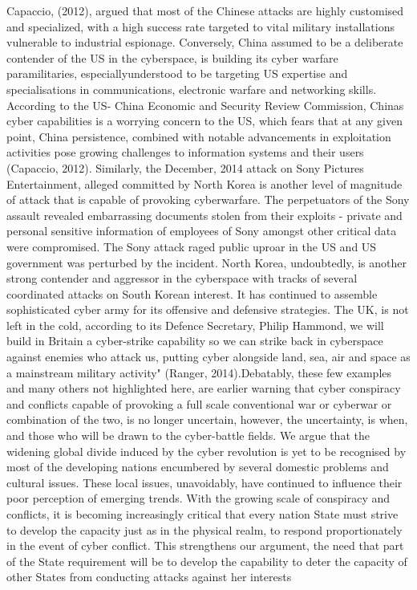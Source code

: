 \documentclass[11pt,a4paper]{article}
\begin{document}
Capaccio, (2012), argued that most of the Chinese attacks are highly customised and specialized, with a high success rate targeted to vital military installations vulnerable to industrial espionage. Conversely, China assumed 
to be a deliberate contender of the US in the cyberspace, is building its cyber warfare paramilitaries, especiallyunderstood to be targeting US expertise and specialisations in communications, electronic warfare and 
networking skills. According to the US- China Economic and Security Review Commission, Chinas cyber capabilities is a worrying concern to the US, which fears that at any given point, China persistence, combined 
with notable advancements in exploitation activities pose growing challenges to information systems and their users (Capaccio, 2012). 
Similarly, the December, 2014 attack on Sony Pictures Entertainment, alleged committed by North Korea is another level of magnitude of attack that is capable of provoking cyberwarfare. The perpetuators of the 
Sony assault revealed embarrassing documents stolen from their exploits - private and personal sensitive information of employees of Sony amongst other critical data were compromised. The Sony attack raged public 
uproar in the US and US government was perturbed by the incident. North Korea, undoubtedly, is another strong contender and aggressor in the cyberspace with tracks of several coordinated attacks on South Korean interest. It 
has continued to assemble sophisticated cyber army for its offensive and defensive strategies. The UK, is not left in the cold, according to its Defence Secretary, Philip Hammond, we will build in Britain a cyber-strike 
capability so we can strike back in cyberspace against enemies who attack us, putting cyber alongside land, sea, air and space as a mainstream military activity" (Ranger, 2014).Debatably, these few examples and many others not highlighted here, are earlier warning that cyber 
conspiracy and conflicts capable of provoking a full scale conventional war or cyberwar or combination of the two, is no longer uncertain, however, the uncertainty, is when, and those who will be drawn to the cyber-battle 
fields. We argue that the widening global divide induced by the cyber revolution is yet to be recognised by most of the developing nations encumbered by several domestic problems and cultural issues. These local issues,
unavoidably, have continued to influence their poor perception of emerging trends. With the growing scale of conspiracy and conflicts, it is becoming increasingly critical that every nation State must strive to develop the capacity just as in the physical realm, to respond proportionately in the event of cyber conflict. This strengthens our argument, the need that part of the State requirement will be to develop the capability to deter the capacity of other States from conducting attacks against her interests
\end{document}
